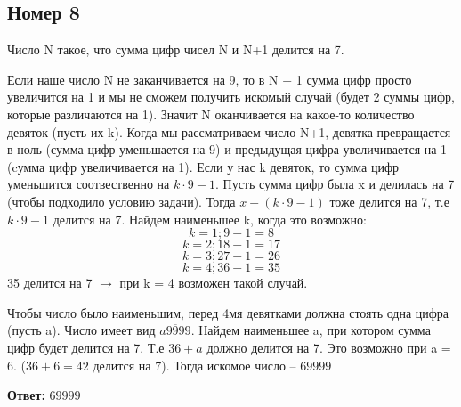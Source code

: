 \documentclass[a4paper,12pt]{article}
\begin{document}
\subsection*{Номер 8}
Число N такое, что сумма цифр чисел  N и N+1 делится на 7. 

Если наше число N не заканчивается на 9, то в N + 1 сумма цифр просто увеличится на 1 и мы не сможем получить искомый случай (будет 2 суммы цифр, которые различаются на 1). Значит N оканчивается на какое-то количество девяток (пусть их k). Когда мы рассматриваем число N+1, девятка превращается в ноль (сумма цифр уменьшается на 9) и предыдущая цифра увеличивается на 1 (cумма цифр увеличивается на 1). Если у нас k девяток, то сумма цифр уменьшится соотвественно на $k \cdot 9 - 1$. Пусть сумма цифр была x и делилась на 7 (чтобы подходило условию задачи). Тогда $x - (k \cdot 9 - 1)$ тоже делится на 7, т.е $k \cdot 9 - 1$ делится на 7. Найдем наименьшее k, когда это возможно:
\[
k = 1; 9 - 1 = 8 
\]
\[
k = 2;18 - 1 = 17 
\]
\[
k = 3; 27 - 1 = 26
\]
\[ 
k = 4; 36 - 1 = 35 
\]
35 делится на 7 $\rightarrow$ при k = 4 возможен такой случай.

Чтобы число было наименьшим, перед 4мя девятками должна стоять одна цифра (пусть a).
Число имеет вид $\overline{a9999}$. Найдем наименьшее a, при котором сумма цифр будет делится на 7. Т.е $36 + a$ должно делится на 7. Это возможно при a = 6. ($36 + 6 = 42$ делится на 7). Тогда искомое число -- $69999$
\begin{center}
\textbf{Ответ:} $69999$
\end{center}
\end{document}
